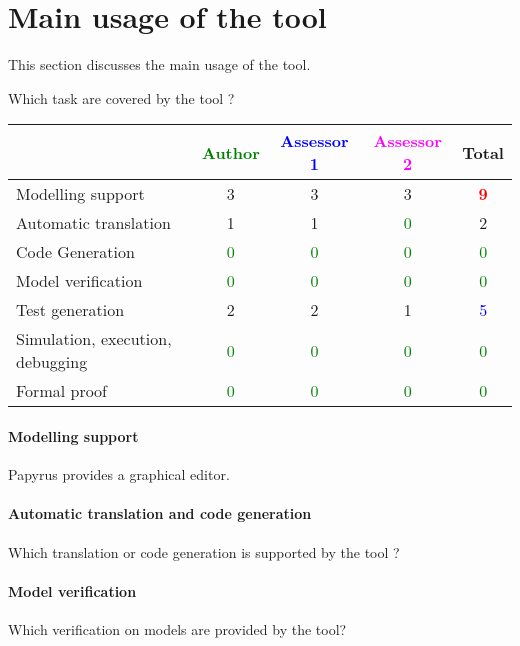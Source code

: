 \section{Main usage of the tool}
\label{main_usage}

This section discusses the main usage of the tool.

Which task are covered by the tool ?


\begin{tabular}{|l | c | c | c | c|}
\hline
& \textcolor{green}{Author} & \textcolor{blue}{Assessor 1} & \textcolor{magenta}{Assessor 2} & Total \\
\hline
Modelling support & 3    & 3    & 3    & \textcolor{red}{\textbf{9}} \\
\hline
Automatic translation & 1    & 1    & \textcolor{green}{0} & 2    \\
\hline
Code Generation & \textcolor{green}{0} & \textcolor{green}{0} & \textcolor{green}{0} & \textcolor{green}{0} \\
\hline
Model verification & \textcolor{green}{0} & \textcolor{green}{0} & \textcolor{green}{0} & \textcolor{green}{0} \\
\hline
Test generation & 2    & 2    & 1    & \textcolor{blue}{5} \\
\hline
Simulation, execution, debugging & \textcolor{green}{0} & \textcolor{green}{0} & \textcolor{green}{0} & \textcolor{green}{0} \\
\hline
Formal proof & \textcolor{green}{0} & \textcolor{green}{0} & \textcolor{green}{0} & \textcolor{green}{0} \\
\hline
\end{tabular}

\paragraph{Modelling support}
Papyrus provides a graphical editor.

\paragraph{Automatic translation and code generation}
Which translation or code generation is supported by the tool ?

\paragraph{Model verification}
Which verification on models are provided by the tool?

